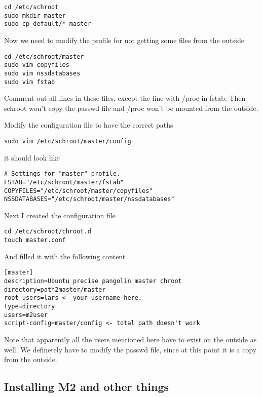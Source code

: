 \documentclass[a4paper]{article}
\begin{document}
\begin{verbatim}
cd /etc/schroot
sudo mkdir master
sudo cp default/* master
\end{verbatim}

Now we need to modify the profile for not getting some files from the outside

\begin{verbatim}
cd /etc/schroot/master
sudo vim copyfiles
sudo vim nssdatabases
sudo vim fstab
\end{verbatim}

Comment out all lines in these files, except the line with /proc in fstab. Then schroot won't copy the passwd file and /proc won't be mounted from the outside.

Modify the configuration file to have the correct paths

\begin{verbatim}
sudo vim /etc/schroot/master/config
\end{verbatim}

it should look like

\begin{verbatim}
# Settings for "master" profile.
FSTAB="/etc/schroot/master/fstab"
COPYFILES="/etc/schroot/master/copyfiles"
NSSDATABASES="/etc/schroot/master/nssdatabases"
\end{verbatim}

Next I created the configuration file

\begin{verbatim}
cd /etc/schroot/chroot.d
touch master.conf
\end{verbatim}

And filled it with the following content

\begin{verbatim}
[master]
description=Ubuntu precise pangolin master chroot
directory=path2master/master
root-users=lars <- your username here.
type=directory
users=m2user
script-config=master/config <- total path doesn't work
\end{verbatim}

Note that apparently all the users mentioned here have to exist on the outside as well.
We definetely have to modify the passwd file, since at this point it is a copy from the outside.

\subsection{Installing M2 and other things}
\end{document}
